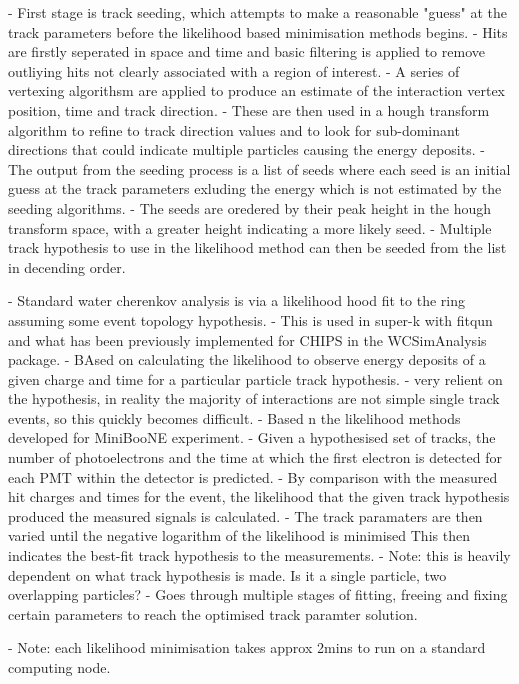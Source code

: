 - First stage is track seeding, which attempts to make a reasonable "guess" at the track
parameters before the likelihood based minimisation methods begins.
- Hits are firstly seperated in space and time and basic filtering is applied to remove outliying
hits not clearly associated with a region of interest.
- A series of vertexing algorithsm are applied to produce an estimate of the interaction vertex
position, time and track direction.
- These are then used in a hough transform algorithm to refine to track direction values and to
look for sub-dominant directions that could indicate multiple particles causing the energy
deposits.
- The output from the seeding process is a list of seeds where each seed is an initial guess
at the track parameters exluding the energy which is not estimated by the seeding algorithms.
- The seeds are oredered by their peak height in the hough transform space, with a greater height
indicating a more likely seed.
- Multiple track hypothesis to use in the likelihood method can then be seeded from the list in
decending order.

- Standard water cherenkov analysis is via a likelihood hood fit to the ring assuming some event
topology hypothesis.
- This is used in super-k with fitqun and what has been previously implemented for CHIPS in the
WCSimAnalysis package.
- BAsed on calculating the likelihood to observe energy deposits of a given charge and time for
a particular particle track hypothesis.
- very relient on the hypothesis, in reality the majority of interactions are not simple single
track events, so this quickly becomes difficult.
- Based n the likelihood methods developed for MiniBooNE experiment.
- Given a hypothesised set of tracks, the number of photoelectrons and the time at which the
first electron is detected for each PMT within the detector is predicted.
- By comparison with the measured hit charges and times for the event, the likelihood that the
given track hypothesis produced the measured signals is calculated.
- The track paramaters are then varied until the negative logarithm of the likelihood is minimised
This then indicates the best-fit track hypothesis to the measurements.
- Note: this is heavily dependent on what track hypothesis is made. Is it a single particle, two
overlapping particles?
- Goes through multiple stages of fitting, freeing and fixing certain parameters to reach the
optimised track paramter solution.

- Note: each likelihood minimisation takes approx 2mins to run on a standard computing node.

